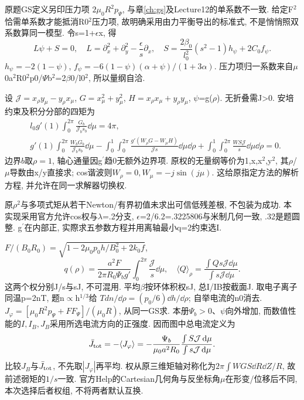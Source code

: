 \begin{solution}
原题GS定义另印压力项 $2\mu_0R^2p_\Psi$, 与章\ref{ch:gs}及Lecture12的单系数不一致. 给定F\ensuremath{{}^{2}}恰需单系数才能抵消R0\ensuremath{{}^{2}}压力项, 故明确采用由力平衡导出的标准式, 不是悄悄照双系数算同一模型. 令s=1+\ensuremath{\epsilon}x, 得
\begin{equation}
 L\psi+S=0,\quad L=\partial_x^2+\partial_y^2-\frac\epsilon s\partial_x,\quad
 S=\frac{2\beta_0}{l_0^2}(s^2-1)h_\psi+2C_0f_\psi.
\end{equation}
$h_\psi=-2(1-\psi)$, $f_\psi=-6(1-\psi)(\alpha+\psi)/(1+3\alpha)$. 压力项归一系数来自\ensuremath{\mu}0a\ensuremath{{}^{2}}R0\ensuremath{{}^{2}}p0/\ensuremath{\Psi}b\ensuremath{{}^{2}}=2\ensuremath{\beta}0/l0\ensuremath{{}^{2}}, 所以量纲自洽.

设 $\mathcal J=x_\rho y_\mu-y_\rho x_\mu$, $G=x_\mu^2+y_\mu^2$, $H=x_\rho x_\mu+y_\rho y_\mu$, \ensuremath{\psi}=g(\ensuremath{\rho}). 无折叠需J>0. 安培约束及积分分部的四矩为
\begin{align}
 &l_0g'(1)\int_0^{2\pi}\frac{G_b}{\mathcal J_bs_b}\dd\mu=4\pi,\\
 &g'(1)\int_0^{2\pi}\frac{W_bG_b}{\mathcal J_bs_b}\dd\mu
 -\int_0^1\!\int_0^{2\pi}\frac{g'(W_\rho G-W_\mu H)}{\mathcal Js}\dd\mu\dd\rho
 +\int_0^1\!\int_0^{2\pi}\frac{WS\mathcal J}{s}\dd\mu\dd\rho=0.
\end{align}
边界$b$取$\rho=1$, 轴心通量因g\ensuremath{{}^{\prime}}趋0无额外边界项. 原权的无量纲等价为1,x,x\ensuremath{{}^{2}},y\ensuremath{{}^{2}}, 其\ensuremath{\rho}/\ensuremath{\mu}导数由x/y直接求; cos谐波则$W_\rho=0,W_\mu=-j\sin(j\mu)$. 这给原指定方法的解析方程, 并允许在同一求解器切换权.

原\ensuremath{\rho}\ensuremath{{}^{2}}与多项式矩从若干Newton/有界初值未求出可信低残差根, 不包装为成功. 本实现采用官方允许cos权与\ensuremath{\lambda}=.2分支, \ensuremath{\epsilon}=2/6.2=.3225806与米制几何一致, .32是题圆整. g\ensuremath{{}^{\prime}}在内部正, 实際求五参数方程并用离轴最小q=2约束选I.

$F/(B_0R_0)=\sqrt{1-2\mu_0p_0h/B_0^2+2k_0f}$,
\begin{equation}
 q(\rho)=\frac{a^2F}{2\pi R_0\Psi_bg'}\int_0^{2\pi}\frac{\mathcal J}{s}\dd\mu,\quad
 \langle Q\rangle_\rho=\frac{\int Qs\mathcal J\dd\mu}{\int s\mathcal J\dd\mu}.
\end{equation}
这两个权分别J/s与sJ, 不可混用. 平均\ensuremath{\beta}按环体积权sJ, 总I/IB按截面J. 取电子离子同温p=2nT, 题n\ensuremath{\propto}h$^{1/3}$给 $Tdn/\dd\rho=(p_0/6)\dd h/\dd\rho$; 自举电流的n0消去. $J_\varphi=[\mu_0R^2p_\Psi+FF_\Psi]/(\mu_0R)$, 从同一GS求. 本册$\Psi_b>0$、$\psi$向外增加, 而数值性能的$I,I_B,J_B$采用所选电流方向的正强度. 因而图中总电流定义为
\begin{equation}
 \bar J_{\rm tot}=-\langle J_\varphi\rangle=-\frac{\Psi_b}{\mu_0a^2R_0}\frac{\int S\mathcal J\,\mathrm d\mu}{\int s\mathcal J\,\mathrm d\mu}.
\end{equation}
比较$J_B$与$\bar J_{\rm tot}$, 不先取$|J_\varphi|$再平均. 权从原三维矩轴对称化为$2\pi\int W GS\dd R\dd Z/R$, 故前述弱矩的$1/s$一致. 官方Help的Cartesian几何角与反坐标角$\mu$在形变/位移后不同, 本次选择后者权组, 不将两者默认互换.


\end{solution}
